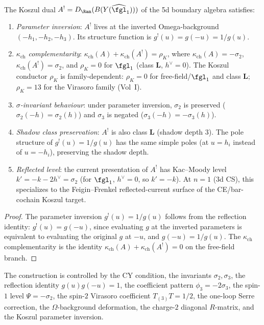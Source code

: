 \begin{proposition}
\label{prop:5d-koszul-dual}
The Koszul dual $A^! = D_{\Ran}(B(Y(\widehat{\fgl}_1)))$ of the 5d boundary algebra satisfies:
\begin{enumerate}[label=\textup{(\roman*)}]
 \item \emph{Parameter inversion}: $A^!$ lives at the inverted Omega-background $(-h_1, -h_2, -h_3)$. Its structure function is $g^!(u) = g(-u) = 1/g(u)$.
 \item \emph{$\kappa_{\mathrm{ch}}$ complementarity}: $\kappa_{\mathrm{ch}}(A) + \kappa_{\mathrm{ch}}(A^!) = \rho_K$, where $\kappa_{\mathrm{ch}}(A) = -\sigma_2$, $\kappa_{\mathrm{ch}}(A^!) = \sigma_2$, and $\rho_K = 0$ for $\fgl_1$ (class $\mathbf{L}$, $h^\vee = 0$). The Koszul conductor $\rho_K$ is family-dependent: $\rho_K = 0$ for free-field/$\fgl_1$ and class $\mathbf{L}$; $\rho_K = 13$ for the Virasoro family (Vol~I).
 \item \emph{$\sigma$-invariant behaviour}: under parameter inversion, $\sigma_2$ is preserved ($\sigma_2(-h) = \sigma_2(h)$) and $\sigma_3$ is negated ($\sigma_3(-h) = -\sigma_3(h)$).
 \item \emph{Shadow class preservation}: $A^!$ is also class $\mathbf{L}$ (shadow depth $3$). The pole structure of $g^!(u) = 1/g(u)$ has the same simple poles (at $u = h_i$ instead of $u = -h_i$), preserving the shadow depth.
 \item \emph{Reflected level}: the current presentation of $A^!$ has Kac--Moody level $k' = -k - 2h^\vee = \sigma_2$ (for $\fgl_1$, $h^\vee = 0$, so $k' = -k$). At $n = 1$ (3d CS), this specializes to the Feigin--Frenkel reflected-current surface of the CE/bar-cochain Koszul target.
\end{enumerate}
\end{proposition}

\begin{proof}
The parameter inversion $g^!(u)=1/g(u)$ follows from the reflection
identity: $g^!(u)=g(-u)$, since evaluating $g$ at the inverted
parameters is equivalent to evaluating the original $g$ at $-u$, and
$g(-u)=1/g(u)$.  The $\kappa_{\mathrm{ch}}$ complementarity is the
identity
$\kappa_{\mathrm{ch}}(A)+\kappa_{\mathrm{ch}}(A^!)=0$ on the free-field
branch.
\end{proof}

\begin{remark}
\label{rem:costello-5d-summary}
The construction is controlled by the CY condition, the invariants
$\sigma_2,\sigma_3$, the reflection identity $g(u)g(-u)=1$, the
coefficient pattern $\phi_3=-2\sigma_3$, the spin-$1$ level
$\Psi=-\sigma_2$, the spin-$2$ Virasoro coefficient
$T_{(3)}T=1/2$, the one-loop Serre correction, the
$\Omega$-background deformation, the charge-$2$ diagonal $R$-matrix,
and the Koszul parameter inversion.
\end{remark}


